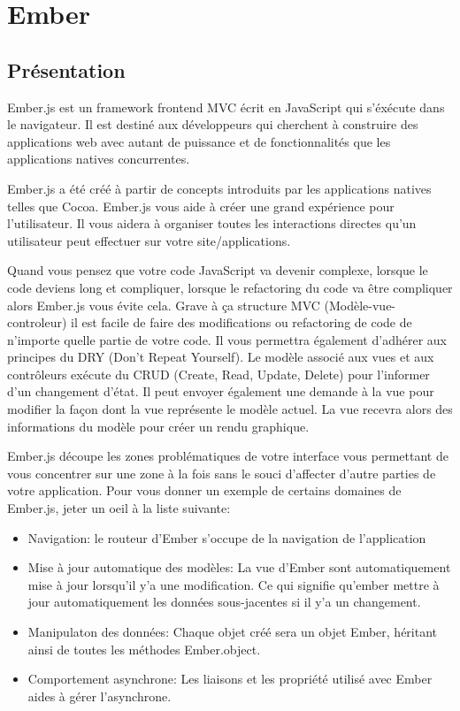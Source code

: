 \section{Ember}
\label{ch:ember}

\subsection{Présentation}


Ember.js est un framework frontend MVC écrit en JavaScript qui s’éxécute dans le navigateur. Il est destiné aux développeurs qui cherchent à construire des applications web avec autant de puissance et de fonctionnalités que les applications natives concurrentes.

Ember.js a été créé à partir de concepts introduits par les applications natives telles que Cocoa. Ember.js vous aide à créer une grand expérience pour l’utilisateur. Il vous aidera à organiser toutes les interactions directes qu’un utilisateur peut effectuer sur votre site/applications.

Quand vous pensez que votre code JavaScript va devenir complexe, lorsque le code deviens long et compliquer, lorsque le refactoring du code va être compliquer alors Ember.js vous évite cela. Grave à ça structure MVC (Modèle-vue-controleur) il est facile de faire des modifications ou refactoring de code de n’importe quelle partie de votre code. Il vous permettra également d’adhérer aux principes du DRY (Don’t Repeat Yourself). Le modèle associé aux vues et aux contrôleurs exécute du CRUD (Create, Read, Update, Delete) pour l’informer d’un changement d’état. Il peut envoyer également une demande à la vue pour modifier la façon dont la vue représente le modèle actuel. La vue recevra alors des informations du modèle pour créer un rendu graphique. 

Ember.js découpe les zones problématiques de votre interface vous permettant de vous concentrer sur une zone à la fois sans le souci d’affecter d’autre parties de votre application. Pour vous donner un exemple de certains domaines de Ember.js, jeter un oeil à la liste suivante:

\begin{itemize}

  \item[\textbullet]
  Navigation: le routeur d’Ember s’occupe de la navigation de l'application

  \item[\textbullet]
  Mise à jour automatique des modèles: La vue d’Ember sont automatiquement mise à jour lorsqu’il y’a une modification. Ce qui signifie qu’ember mettre à jour automatiquement les données sous-jacentes si il y’a un changement.

  \item[\textbullet]
  Manipulaton des données: Chaque objet créé sera un objet Ember, héritant ainsi de toutes les méthodes Ember.object.

  \item[\textbullet]
  Comportement asynchrone: Les liaisons et les propriété utilisé avec Ember aides à gérer l’asynchrone.

\end{itemize}

